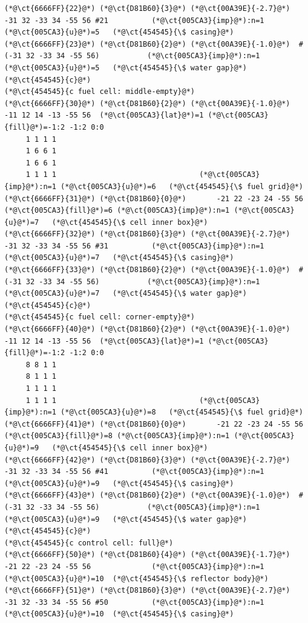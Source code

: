 \begin{lstlisting}
(*@\ct{6666FF}{22}@*) (*@\ct{D81B60}{3}@*) (*@\ct{00A39E}{-2.7}@*)  -31 32 -33 34 -55 56 #21          (*@\ct{005CA3}{imp}@*):n=1 (*@\ct{005CA3}{u}@*)=5   (*@\ct{454545}{\$ casing}@*)
(*@\ct{6666FF}{23}@*) (*@\ct{D81B60}{2}@*) (*@\ct{00A39E}{-1.0}@*)  #(-31 32 -33 34 -55 56)           (*@\ct{005CA3}{imp}@*):n=1 (*@\ct{005CA3}{u}@*)=5   (*@\ct{454545}{\$ water gap}@*)
(*@\ct{454545}{c}@*)
(*@\ct{454545}{c fuel cell: middle-empty}@*)
(*@\ct{6666FF}{30}@*) (*@\ct{D81B60}{2}@*) (*@\ct{00A39E}{-1.0}@*)  -11 12 14 -13 -55 56  (*@\ct{005CA3}{lat}@*)=1 (*@\ct{005CA3}{fill}@*)=-1:2 -1:2 0:0
     1 1 1 1
     1 6 6 1
     1 6 6 1
     1 1 1 1                                 (*@\ct{005CA3}{imp}@*):n=1 (*@\ct{005CA3}{u}@*)=6   (*@\ct{454545}{\$ fuel grid}@*)
(*@\ct{6666FF}{31}@*) (*@\ct{D81B60}{0}@*)       -21 22 -23 24 -55 56       (*@\ct{005CA3}{fill}@*)=6 (*@\ct{005CA3}{imp}@*):n=1 (*@\ct{005CA3}{u}@*)=7   (*@\ct{454545}{\$ cell inner box}@*)
(*@\ct{6666FF}{32}@*) (*@\ct{D81B60}{3}@*) (*@\ct{00A39E}{-2.7}@*)  -31 32 -33 34 -55 56 #31          (*@\ct{005CA3}{imp}@*):n=1 (*@\ct{005CA3}{u}@*)=7   (*@\ct{454545}{\$ casing}@*)
(*@\ct{6666FF}{33}@*) (*@\ct{D81B60}{2}@*) (*@\ct{00A39E}{-1.0}@*)  #(-31 32 -33 34 -55 56)           (*@\ct{005CA3}{imp}@*):n=1 (*@\ct{005CA3}{u}@*)=7   (*@\ct{454545}{\$ water gap}@*)
(*@\ct{454545}{c}@*)
(*@\ct{454545}{c fuel cell: corner-empty}@*)
(*@\ct{6666FF}{40}@*) (*@\ct{D81B60}{2}@*) (*@\ct{00A39E}{-1.0}@*)  -11 12 14 -13 -55 56  (*@\ct{005CA3}{lat}@*)=1 (*@\ct{005CA3}{fill}@*)=-1:2 -1:2 0:0
     8 8 1 1
     8 1 1 1
     1 1 1 1
     1 1 1 1                                 (*@\ct{005CA3}{imp}@*):n=1 (*@\ct{005CA3}{u}@*)=8   (*@\ct{454545}{\$ fuel grid}@*)
(*@\ct{6666FF}{41}@*) (*@\ct{D81B60}{0}@*)       -21 22 -23 24 -55 56       (*@\ct{005CA3}{fill}@*)=8 (*@\ct{005CA3}{imp}@*):n=1 (*@\ct{005CA3}{u}@*)=9   (*@\ct{454545}{\$ cell inner box}@*)
(*@\ct{6666FF}{42}@*) (*@\ct{D81B60}{3}@*) (*@\ct{00A39E}{-2.7}@*)  -31 32 -33 34 -55 56 #41          (*@\ct{005CA3}{imp}@*):n=1 (*@\ct{005CA3}{u}@*)=9   (*@\ct{454545}{\$ casing}@*)
(*@\ct{6666FF}{43}@*) (*@\ct{D81B60}{2}@*) (*@\ct{00A39E}{-1.0}@*)  #(-31 32 -33 34 -55 56)           (*@\ct{005CA3}{imp}@*):n=1 (*@\ct{005CA3}{u}@*)=9   (*@\ct{454545}{\$ water gap}@*)
(*@\ct{454545}{c}@*)
(*@\ct{454545}{c control cell: full}@*)
(*@\ct{6666FF}{50}@*) (*@\ct{D81B60}{4}@*) (*@\ct{00A39E}{-1.7}@*)  -21 22 -23 24 -55 56              (*@\ct{005CA3}{imp}@*):n=1 (*@\ct{005CA3}{u}@*)=10  (*@\ct{454545}{\$ reflector body}@*)
(*@\ct{6666FF}{51}@*) (*@\ct{D81B60}{3}@*) (*@\ct{00A39E}{-2.7}@*)  -31 32 -33 34 -55 56 #50          (*@\ct{005CA3}{imp}@*):n=1 (*@\ct{005CA3}{u}@*)=10  (*@\ct{454545}{\$ casing}@*)

\end{lstlisting}

